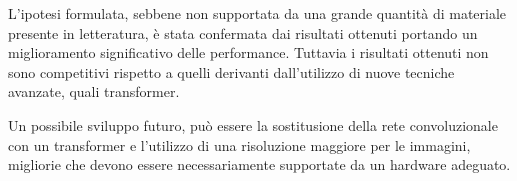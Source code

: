 L'ipotesi formulata, sebbene non supportata da una grande quantità di materiale presente in letteratura, è stata confermata dai risultati ottenuti portando un miglioramento significativo delle performance. Tuttavia i risultati ottenuti non sono competitivi rispetto a quelli derivanti dall'utilizzo di nuove tecniche avanzate, quali transformer.

Un possibile sviluppo futuro, può essere la sostitusione della rete convoluzionale con un transformer e l'utilizzo di una risoluzione maggiore per le immagini, migliorie che devono essere necessariamente supportate da un hardware adeguato.




